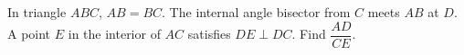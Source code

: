 In triangle $ABC$, $AB=BC$. The internal angle bisector from $C$ meets $AB$ at $D$. A point $E$ in the interior of $AC$ satisfies $DE\perp DC$. Find $\dfrac{AD}{CE}$.
